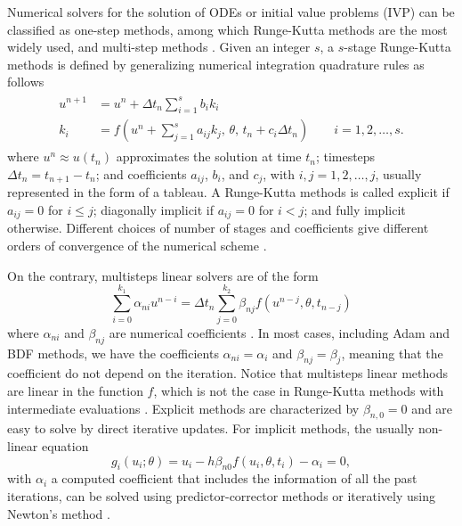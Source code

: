 Numerical solvers for the solution of ODEs or initial value problems (IVP) can be classified as one-step methods, among which Runge-Kutta methods are the most widely used, and multi-step methods \cite{hairer-solving-1}.
Given an integer $s$, a $s$-stage Runge-Kutta methods is defined by generalizing numerical integration quadrature rules as follows
\begin{align}
\begin{split}
    u^{n+1} 
    &= 
    u^n 
    + 
    \Delta t_n \sum_{i=1}^s b_i k_i \\
    k_i 
    &= 
    f \left(u^n + \sum_{j=1}^s a_{ij} k_j , \, \theta , \, t_n + c_i \Delta t_n \right) \qquad i=1,2, \ldots, s.
    \label{eq:Runge-Kutta-scheme}
\end{split}
\end{align}
where $u^{n} \approx u(t_n)$ approximates the solution at time $t_n$; timesteps $\Delta t_n = t_{n+1}-t_n$; and coefficients $a_{ij}$, $b_i$, and $c_j$, with $i,j=1, 2,\ldots, j$, usually represented in the form of a tableau. 
A Runge-Kutta methods is called explicit if $a_{ij}=0$ for $i \leq j$; diagonally implicit if $a_{ij}=0$ for $i < j$; and fully implicit otherwise. 
Different choices of number of stages and coefficients give different orders of convergence of the numerical scheme \cite{Butcher_Wanner_1996, Butcher_2001}. 

On the contrary, multisteps linear solvers are of the form 
\begin{equation}
    \sum_{i=0}^{k_1} \alpha_{ni} u^{n-i} 
    =
    \Delta t_n \sum_{j=0}^{k_2} \beta_{nj} f(u^{n-j}, \theta, t_{n-j})
\end{equation}
where $\alpha_{ni}$ and $\beta_{nj}$ are numerical coefficients \cite{hairer-solving-1}.
In most cases, including Adam and BDF methods, we have the coefficients $\alpha_{ni} = \alpha_i$ and $\beta_{nj}=\beta_j$, meaning that the coefficient do not depend on the iteration. 
Notice that multisteps linear methods are linear in the function $f$, which is not the case in Runge-Kutta methods with intermediate evaluations \cite{ascher2008numerical}.
Explicit methods are characterized by $\beta_{n, 0} = 0$ and are easy to solve by direct iterative updates. 
For implicit methods, the usually non-linear equation 
\begin{equation}
    g_i(u_i; \theta) = u_i - h \beta_{n0} f(u_i, \theta, t_i) - \alpha_i = 0,
    \label{eq:solver-constriant-example}
\end{equation}
with $\alpha_i$ a computed coefficient that includes the information of all the past iterations, can be solved using predictor-corrector methods \cite{hairer-solving-1} or iteratively using Newton's method \cite{SUNDIALS-hindmarsh2005sundials}.  

